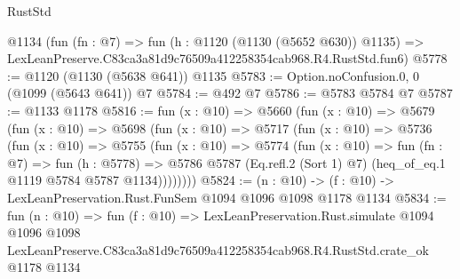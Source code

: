 \begin{lexlean}{RustStd}
\begin{coremodule}
    @1134
    (fun (fn : @7) =>
    fun (h : @1120 (@1130 (@5652 @630)) @1135) =>
    LexLeanPreserve.C83ca3a81d9c76509a412258354cab968.R4.RustStd.fun6)
@5778 := @1120 (@1130 (@5638 @641)) @1135
@5783 := Option.noConfusion.{0, 0} (@1099 (@5643 @641)) @7
@5784 := @492 @7
@5786 := @5783 @5784 @7
@5787 := @1133 @1178
@5816 := fun (x : @10) =>
  @5660
    (fun (x : @10) =>
    @5679
      (fun (x : @10) =>
      @5698
        (fun (x : @10) =>
        @5717
          (fun (x : @10) =>
          @5736
            (fun (x : @10) =>
            @5755
              (fun (x : @10) =>
              @5774
                (fun (x : @10) =>
                fun (fn : @7) =>
                fun (h : @5778) =>
                @5786 @5787 (Eq.refl.{2} (Sort 1) @7) (heq_of_eq.{1} @1119 @5784 @5787 @1134))))))))
@5824 := (n : @10) -> (f : @10) -> LexLeanPreservation.Rust.FunSem @1094 @1096 @1098 @1178 @1134
@5834 := fun (n : @10) =>
  fun (f : @10) =>
  LexLeanPreservation.Rust.simulate
    @1094
    @1096
    @1098
    LexLeanPreserve.C83ca3a81d9c76509a412258354cab968.R4.RustStd.crate_ok
    @1178
    @1134
\end{coremodule}
\end{lexlean}
